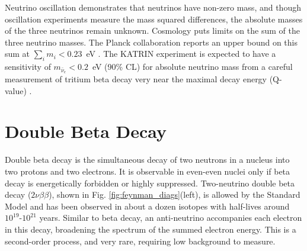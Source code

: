 Neutrino oscillation demonstrates that neutrinos have non-zero mass, and though oscillation experiments measure the mass squared differences, the absolute masses of the three neutrinos remain unknown.  Cosmology puts limits on the sum of the three neutrino masses.  The Planck collaboration reports an upper bound on this sum at $\sum\limits_{i} m_{i} < 0.23$~eV \cite{Planck}.  The KATRIN experiment is expected to have a sensitivity of $m_{\bar{\nu}_{e}} < 0.2$~eV (90\% CL) for absolute neutrino mass from a careful measurement of tritium beta decay very near the maximal decay energy (Q-value) \cite{KATRIN}.

\section{Double Beta Decay}

Double beta decay is the simultaneous decay of two neutrons in a nucleus into two protons and two electrons.  It is observable in even-even nuclei only if beta decay is energetically forbidden or highly suppressed.  Two-neutrino double beta decay ($2\nu\beta\beta$), shown in Fig. \ref{fig:feynman_diags}(left), is allowed by the Standard Model and has been observed in about a dozen isotopes with half-lives around $10^{19}$-$10^{21}$ years.  Similar to beta decay, an anti-neutrino accompanies each electron in this decay, broadening the spectrum of the summed electron energy. This is a second-order process, and very rare, requiring low background to measure.

